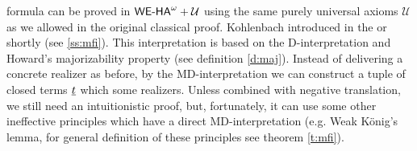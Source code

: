 formula can be proved in ${\textsf{\upshape WE-HA}}^{\omega}+\mathcal{U}$ using the same purely universal
axioms $\mathcal{U}$ as we allowed in the original classical proof. 
%
%
Kohlenbach introduced in \cite{Kohlenbach96mfi}
the  or shortly  
(see \ref{ss:mfi}). 
This interpretation is based on the D-interpretation and Howard's majorizability 
property (see definition \ref{d:maj}). 
Instead of delivering a concrete realizer as before, by the MD-interpretation 
we can construct a tuple of closed terms $\underline t$ which  
some realizers. Unless combined with negative translation, we still need an 
intuitionistic proof, but, fortunately,
it can use some other ineffective principles which have
a direct MD-interpretation (e.g. Weak K\"onig's lemma, for general 
definition of these principles see theorem \ref{t:mfi}).\\


